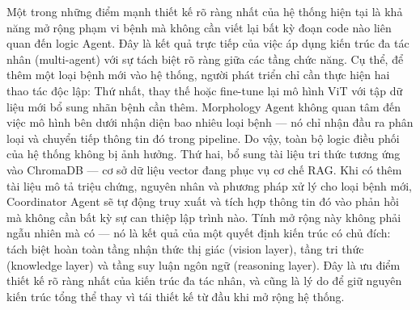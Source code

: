 Một trong những điểm mạnh thiết kế rõ ràng nhất của hệ thống hiện tại là khả năng mở rộng phạm vi bệnh mà không cần viết lại bất kỳ đoạn code nào liên quan đến logic Agent. Đây là kết quả trực tiếp của việc áp dụng kiến trúc đa tác nhân (multi-agent) với sự tách biệt rõ ràng giữa các tầng chức năng. Cụ thể, để thêm một loại bệnh mới vào hệ thống, người phát triển chỉ cần thực hiện hai thao tác độc lập: Thứ nhất, thay thế hoặc fine-tune lại mô hình ViT với tập dữ liệu mới bổ sung nhãn bệnh cần thêm. Morphology Agent không quan tâm đến việc mô hình bên dưới nhận diện bao nhiêu loại bệnh — nó chỉ nhận đầu ra phân loại và chuyển tiếp thông tin đó trong pipeline. Do vậy, toàn bộ logic điều phối của hệ thống không bị ảnh hưởng. Thứ hai, bổ sung tài liệu tri thức tương ứng vào ChromaDB — cơ sở dữ liệu vector đang phục vụ cơ chế RAG. Khi có thêm tài liệu mô tả triệu chứng, nguyên nhân và phương pháp xử lý cho loại bệnh mới, Coordinator Agent sẽ tự động truy xuất và tích hợp thông tin đó vào phản hồi mà không cần bất kỳ sự can thiệp lập trình nào. Tính mở rộng này không phải ngẫu nhiên mà có — nó là kết quả của một quyết định kiến trúc có chủ đích: tách biệt hoàn toàn tầng nhận thức thị giác (vision layer), tầng tri thức (knowledge layer) và tầng suy luận ngôn ngữ (reasoning layer). Đây là ưu điểm thiết kế rõ ràng nhất của kiến trúc đa tác nhân, và cũng là lý do để giữ nguyên kiến trúc tổng thể thay vì tái thiết kế từ đầu khi mở rộng hệ thống.

